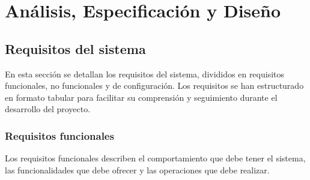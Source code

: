 
\chapter{Análisis, Especificación y Diseño}
\label{analisis}

\section{Requisitos del sistema}
En esta sección se detallan los requisitos del sistema, divididos en requisitos funcionales, no funcionales y de configuración. Los requisitos se han estructurado en formato tabular para facilitar su comprensión y seguimiento durante el desarrollo del proyecto.

\subsection{Requisitos funcionales}
Los requisitos funcionales describen el comportamiento que debe tener el sistema, las funcionalidades que debe ofrecer y las operaciones que debe realizar.

